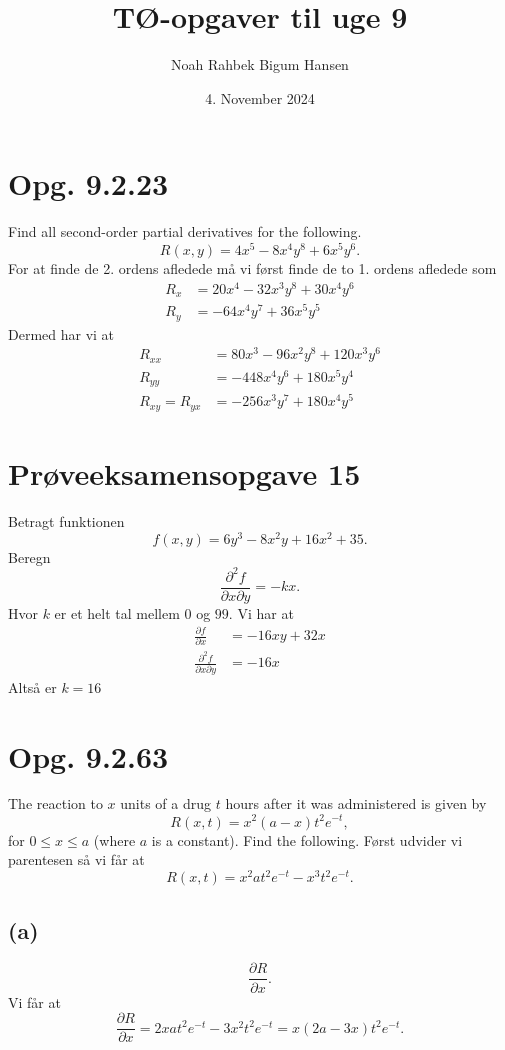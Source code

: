 \documentclass[12pt]{article}
\title{TØ-opgaver til uge 9}
\author{Noah Rahbek Bigum Hansen}
\date{4. November 2024}
\theoremstyle{definition}
\begin{document}
\maketitle

\section*{Opg. 9.2.23}
Find all second-order partial derivatives for the following.
\[ 
R(x,y) = 4x^5 - 8x^4y^8 + 6x^5y^6
.\]
\bigbreak
For at finde de 2. ordens afledede må vi først finde de to 1. ordens afledede som
\begin{align*}
  R_x &= 20x^{4} - 32x^{3}y^{8} + 30x^{4}y^{6} \\
  R_y &= -64x^{4}y^{7} + 36x^{5}y^{5}
\end{align*}
Dermed har vi at
\begin{align*}
  R_{x x} &= 80x^{3} - 96x^2y^{8} + 120x^3y^{6} \\
  R_{yy} &= -448 x^{4}y^{6} + 180 x^{5}y^{4} \\
  R_{xy} = R_{yx} &= -256x^{3}y^{7} + 180x^{4}y^{5} 
\end{align*}



\section*{Prøveeksamensopgave 15}
Betragt funktionen
\[ 
f(x,y) = 6y^3-8x^2y + 16x^2 + 35
.\]
Beregn
\[ 
\frac{\partial^2 f}{\partial x \partial y} = - kx
.\]
Hvor $k$ er et helt tal mellem $0$ og $99$.
\bigbreak
Vi har at
\begin{align*}
  \frac{\partial f}{\partial x} &= -16xy + 32x \\
  \frac{\partial^2 f}{\partial x \partial y} &= -16x
\end{align*}
Altså er $k = 16$

\section*{Opg. 9.2.63}
The reaction to $x$ units of a drug $t$ hours after it was administered is given by
\[ 
R(x,t) = x^2(a-x) t^2e^{-t}
,\]
for $0 \leq x \leq a$ (where $a$ is a constant). Find the following.
\bigbreak
Først udvider vi parentesen så vi får at
\[ 
R(x, t) = x^2at^2e^{-t}-x^3t^2e^{-t}
.\]


\subsection*{(a)}
\[ 
\frac{\partial R}{\partial x}
.\]
\bigbreak
Vi får at
\[ 
\frac{\partial R}{\partial x} = 2xat^2e^{-t}-3x^2t^2e^{-t} = x(2a-3x)t^2e^{-t}
.\]
\end{document}
